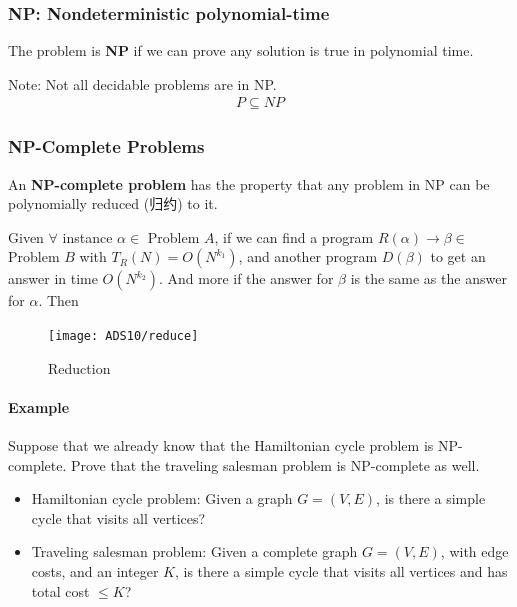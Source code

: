 \subsubsection{NP: Nondeterministic polynomial-time}
The problem is \textbf{NP} if we can prove any solution is true in polynomial time.

Note: Not all decidable problems are in NP. 
\begin{align*}
    P \subseteq NP
\end{align*}

\subsubsection{NP-Complete Problems}

An \textbf{NP-complete problem} has the property that any problem in NP can be \textcolor{light_red}{polynomially reduced (归约)} to it.

\begin{definition}[Reduction]\quad

    Given $\forall$ instance $\alpha \in$ Problem $A$, if we can find a program $R(\alpha)\rightarrow \beta \in$ Problem $B$ with $T_R(N)=O(N^{k_1})$, and another program $D(\beta)$ to get an answer in time $O(N^{k_2})$. And more if the answer for $\beta$ is the same as the answer for $\alpha$. Then 
    \begin{figure}[!htb]
        \centering
        \texttt{[image: ADS10/reduce]}
        \caption{Reduction}
    \end{figure}
\end{definition}

\paragraph{Example}
Suppose that we already know that the Hamiltonian cycle problem is NP-complete.  Prove that the traveling salesman problem is NP-complete as well.

\begin{itemize}
    \item Hamiltonian cycle problem: Given a graph $G=(V, E)$, is there a simple cycle that visits all vertices?
    \item Traveling salesman problem: Given a complete graph $G=(V, E)$, with edge costs, and an integer $K$, is there a simple cycle that visits all vertices and has total cost $\le K$?
\end{itemize}

